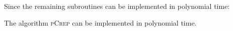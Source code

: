 \documentclass[a4paper,UKenglish,cleveref, autoref, thm-restate,authorcolumns]{lipics-v2019}
\newcommand{\adjDel}{\textsc{pCrep}}
\newcommand{\coreDel}{\text{C{\scriptsize REP}-C{\scriptsize ORE}}}
\newcommand{\dbA}{Mocfe}
\newcommand{\dbB}{NB}
\newcommand{\dbC}{MG}
\begin{document}
Since the remaining subroutines can be implemented in polynomial time:

\begin{theorem}
	\label{run_time_theo}
	The algorithm \adjDel{} can be implemented in polynomial time.
\end{theorem}

\end{document}
